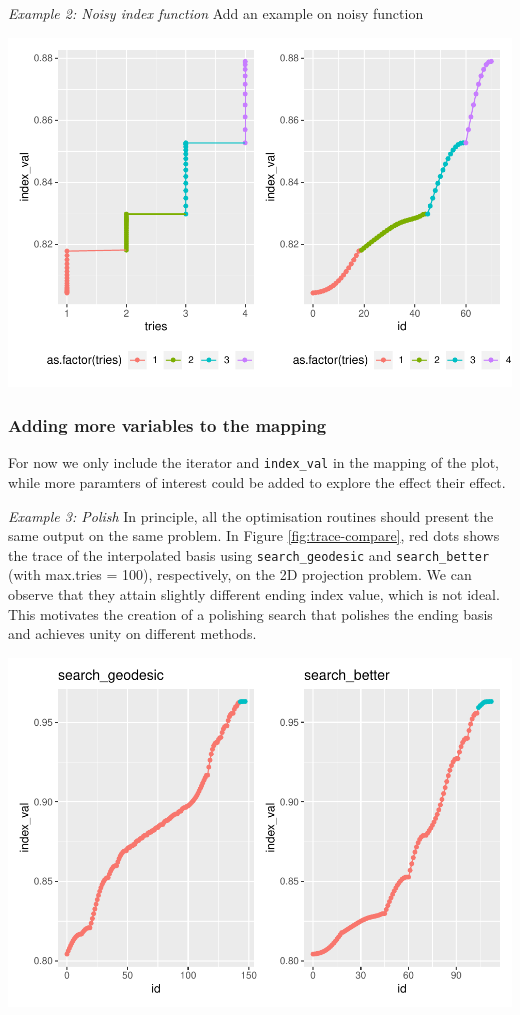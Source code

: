 \documentclass[12pt]{article}
\begin{document}
\emph{Example 2: Noisy index function} Add an example on noisy function

\includegraphics{paper_files/figure-latex/interpolation-1.pdf}

\hypertarget{adding-more-variables-to-the-mapping}{%
\subsubsection{Adding more variables to the
mapping}\label{adding-more-variables-to-the-mapping}}

For now we only include the iterator and \texttt{index\_val} in the
mapping of the plot, while more paramters of interest could be added to
explore the effect their effect.

\emph{Example 3: Polish} In principle, all the optimisation routines
should present the same output on the same problem. In Figure
\ref{fig:trace-compare}, red dots shows the trace of the interpolated
basis using \texttt{search\_geodesic} and \texttt{search\_better} (with
max.tries = 100), respectively, on the 2D projection problem. We can
observe that they attain slightly different ending index value, which is
not ideal. This motivates the creation of a polishing search that
polishes the ending basis and achieves unity on different methods.

\includegraphics{paper_files/figure-latex/polish-1.pdf}
\end{document}
